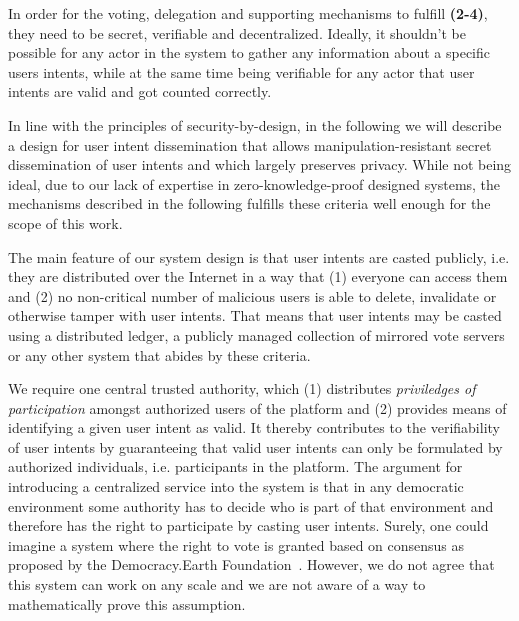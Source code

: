 In order for the voting, delegation and supporting mechanisms to fulfill \textbf{(2-4)}, they need to be secret, verifiable and decentralized.
Ideally, it shouldn't be possible for any actor in the system to gather any information about a specific users intents, while at the same time being verifiable for any actor that user intents are valid and got counted correctly. 

In line with the principles of security-by-design, in the following we will describe a design for user intent dissemination that allows manipulation-resistant secret dissemination of user intents and which largely preserves privacy.
While not being ideal, due to our lack of expertise in zero-knowledge-proof designed systems, the mechanisms described in the following fulfills these criteria well enough for the scope of this work.

The main feature of our system design is that user intents are casted publicly, i.e. they are distributed over the Internet in a way that (1) everyone can access them and (2) no non-critical number of malicious users is able to delete, invalidate or otherwise tamper with user intents.
That means that user intents may be casted using a distributed ledger, a publicly managed collection of mirrored vote servers or any other system that abides by these criteria.

We require one central trusted authority, which (1) distributes \textit{priviledges of participation} amongst authorized users of the platform and (2) provides means of identifying a given user intent as valid.
It thereby contributes to the verifiability of user intents by guaranteeing that valid user intents can only be formulated by authorized individuals, i.e. participants in the platform.
The argument for introducing a centralized service into the system is that in any democratic environment some authority has to decide who is part of that environment and therefore has the right to participate by casting user intents.
Surely, one could imagine a system where the right to vote is granted based on consensus as proposed by the Democracy.Earth Foundation~\parencite{DemocracyEarth2018}.
However, we do not agree that this system can work on any scale and we are not aware of a way to mathematically prove this assumption.

